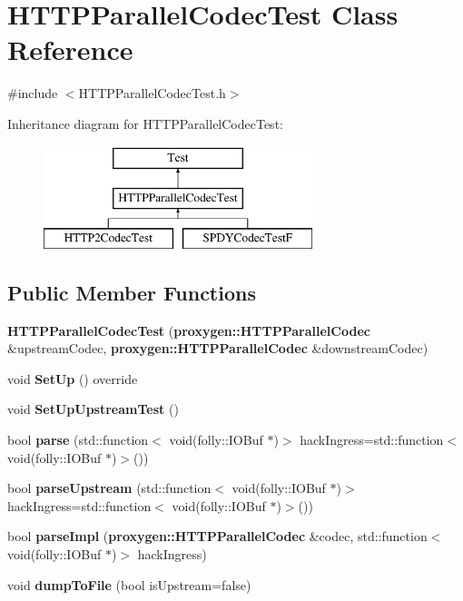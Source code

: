 \section{H\+T\+T\+P\+Parallel\+Codec\+Test Class Reference}
\label{classHTTPParallelCodecTest}


{\ttfamily \#include $<$H\+T\+T\+P\+Parallel\+Codec\+Test.\+h$>$}

Inheritance diagram for H\+T\+T\+P\+Parallel\+Codec\+Test\+:\begin{figure}[H]
\begin{center}
\leavevmode
\includegraphics[height=3.000000cm]{classHTTPParallelCodecTest}
\end{center}
\end{figure}
\subsection*{Public Member Functions}
\begin{DoxyCompactItemize}
\item 
{\bf H\+T\+T\+P\+Parallel\+Codec\+Test} ({\bf proxygen\+::\+H\+T\+T\+P\+Parallel\+Codec} \&upstream\+Codec, {\bf proxygen\+::\+H\+T\+T\+P\+Parallel\+Codec} \&downstream\+Codec)
\item 
void {\bf Set\+Up} () override
\item 
void {\bf Set\+Up\+Upstream\+Test} ()
\item 
bool {\bf parse} (std\+::function$<$ void(folly\+::\+I\+O\+Buf $\ast$)$>$ hack\+Ingress=std\+::function$<$ void(folly\+::\+I\+O\+Buf $\ast$)$>$())
\item 
bool {\bf parse\+Upstream} (std\+::function$<$ void(folly\+::\+I\+O\+Buf $\ast$)$>$ hack\+Ingress=std\+::function$<$ void(folly\+::\+I\+O\+Buf $\ast$)$>$())
\item 
bool {\bf parse\+Impl} ({\bf proxygen\+::\+H\+T\+T\+P\+Parallel\+Codec} \&codec, std\+::function$<$ void(folly\+::\+I\+O\+Buf $\ast$)$>$ hack\+Ingress)
\item 
void {\bf dump\+To\+File} (bool is\+Upstream=false)
\end{DoxyCompactItemize}
